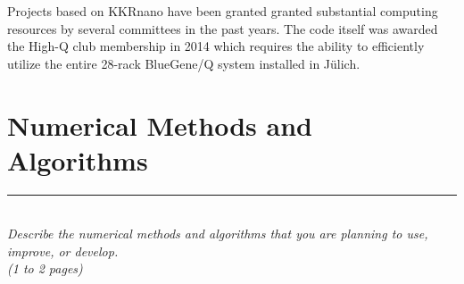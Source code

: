 \documentclass [a4paper, 12pt]{article}
\begin{document}
Projects based on KKRnano have been granted
granted substantial computing resources by several committees in the past years.
The code itself was awarded the High-Q club membership in 2014 which requires the ability to
efficiently utilize the entire 28-rack BlueGene/Q system installed in J\"ulich.




\section{Numerical Methods and Algorithms} 
\rule{\textwidth}{0.4pt}\\
\textit{Describe the numerical methods and algorithms that you are planning to use, improve, or develop.}\\
 
\textit{(1 to 2 pages)}
\bigskip
\end{document}
